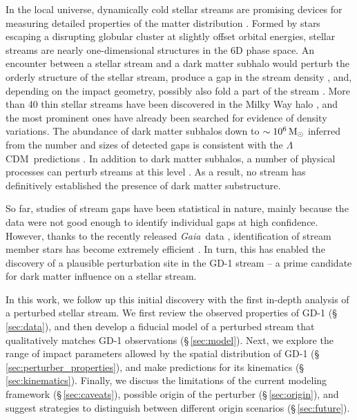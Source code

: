 \documentclass[twocolumn]{aastex62}
\newcommand{\acronym}[1]{{\small{#1}}}
\newcommand{\gaia}{\textsl{Gaia}}
\newcommand{\lcdm}{\acronym{$\Lambda$CDM}}
\begin{document}
In the local universe, dynamically cold stellar streams are promising devices for measuring detailed properties of the matter distribution \citep[e.g.,][]{johnston1999, bh2018}.
Formed by stars escaping a disrupting globular cluster at slightly offset orbital energies, stellar streams are nearly one-dimensional structures in the 6D phase space.
An encounter between a stellar stream and a dark matter subhalo would perturb the orderly structure of the stellar stream, produce a gap in the stream density \citep[e.g.,][]{carlberg2012}, and, depending on the impact geometry, possibly also fold a part of the stream \citep[e.g.,][]{yoon2011}.
More than 40 thin stellar streams have been discovered in the Milky Way halo \citep{gc2016}, and the most prominent ones have already been searched for evidence of density variations.
The abundance of dark matter subhalos down to $\sim10^6\,\rm M_\odot$ inferred from the number and sizes of detected gaps is consistent with the \lcdm\ predictions \citep[e.g.,][]{carlberg2012,cg2013}.
In addition to dark matter subhalos, a number of physical processes can perturb streams at this level \citep[e.g.,][]{kupper2008, amorisco2016}.
As a result, no stream has definitively established the presence of dark matter substructure.

So far, studies of stream gaps have been statistical in nature, mainly because the data were not good enough to identify individual gaps at high confidence.
However, thanks to the recently released \gaia\ data \citep{gdr2}, identification of stream member stars has become extremely efficient \citep[e.g.,][]{malhan2018}.
In turn, this has enabled the discovery of a plausible perturbation site in the GD-1 stream \citep{pwb} -- a prime candidate for dark matter influence on a stellar stream.

In this work, we follow up this initial discovery with the first in-depth analysis of a perturbed stellar stream.
We first review the observed properties of GD-1 (\S\,\ref{sec:data}), and then develop a fiducial model of a perturbed stream that qualitatively matches GD-1 observations (\S\,\ref{sec:model}).
Next, we explore the range of impact parameters allowed by the spatial distribution of GD-1 (\S\,\ref{sec:perturber_properties}), and make predictions for its kinematics (\S\,\ref{sec:kinematics}).
Finally, we discuss the limitations of the current modeling framework (\S\,\ref{sec:caveats}), possible origin of the perturber (\S\,\ref{sec:origin}), and suggest strategies to distinguish between different origin scenarios (\S\,\ref{sec:future}).
\end{document}
